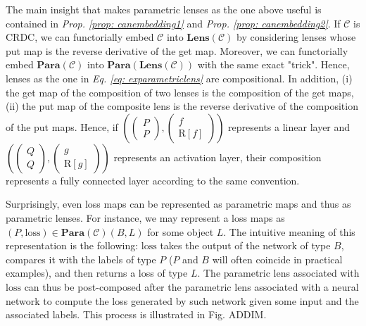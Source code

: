 \documentclass[12pt,a4paper,openright,twoside]{report}
\theoremstyle{plain}
\theoremstyle{definition}
\begin{document}
The main insight that makes parametric lenses as the one above useful is contained in \textit{Prop. \ref{prop: canembedding1}} and \textit{Prop. \ref{prop: canembedding2}}. If $\mathcal{C}$ is CRDC, we can functorially embed $\mathcal{C}$ into $\mathbf{Lens}(\mathcal{C})$ by considering lenses whose put map is the reverse derivative of the get map. Moreover, we can functorially embed $\mathbf{Para}(\mathcal{C})$ into $\mathbf{Para}(\mathbf{Lens}(\mathcal{C}))$ with the same exact "trick". Hence, lenses as the one in \textit{Eq. \ref{eq: exparametriclens}} are compositional. In addition, (i) the get map of the composition of two lenses is the composition of the get maps, (ii) the put map of the composite lens is the reverse derivative of the composition of the put maps. Hence, if $\left(\left(\begin{smallmatrix} P \\ P \end{smallmatrix}\right),\left(\begin{smallmatrix} f \\ \mathrm{R}[f] \end{smallmatrix}\right)\right)$ represents a linear layer and $\left(\left(\begin{smallmatrix} Q \\ Q \end{smallmatrix}\right),\left(\begin{smallmatrix} g \\ \mathrm{R}[g] \end{smallmatrix}\right)\right)$ represents an activation layer, their composition represents a fully connected layer according to the same convention.



Surprisingly, even loss maps can be represented as parametric maps and thus as parametric lenses.
For instance, we may represent a loss maps as $(P,\mathrm{loss}) \in \mathbf{Para}(\mathcal{C})(B,L)$ for some object $L$. The intuitive meaning of this representation is the following: $\mathrm{loss}$ takes the output of the network of type $B$, compares it with the labels of type $P$ ($P$ and $B$ will often coincide in practical examples), and then returns a loss of type $L$. The parametric lens associated with $\mathrm{loss}$ can thus be post-composed after the parametric lens associated with a neural network to compute the loss generated by such network given some input and the associated labels. This process is illustrated in Fig. ADDIM.
\end{document}
